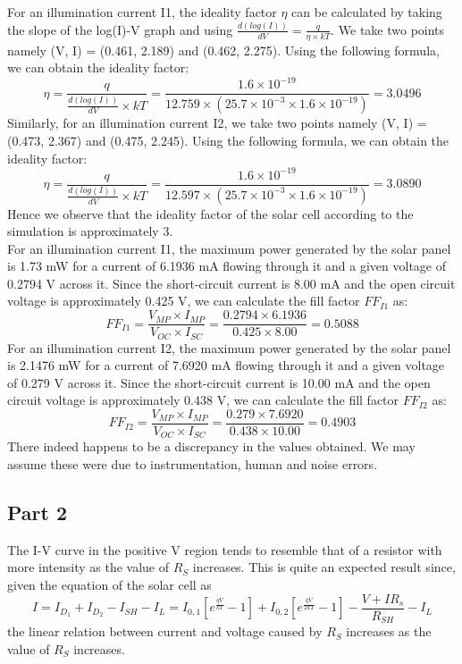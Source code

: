 \documentclass[12pt]{article}
\begin{document}
For an illumination current I1, the ideality factor \( \eta \) can be calculated by taking the slope of the log(I)-V graph and using \( \frac{d(log(I))}{dV} = \frac{q}{\eta \times kT} \). We take two points namely (V, I) = (0.461, 2.189) and (0.462, 2.275). Using the following formula, we can obtain the ideality factor: \[ \eta  = \frac{q}{\frac{d(log(I))}{dV} \times kT} = \frac{1.6 \times 10^{-19}}{12.759 \times \left( 25.7 \times 10^{-3} \times 1.6 \times 10^{-19} \right)} = 3.0496 \]
Similarly, for an illumination current I2, we take two points namely (V, I) = (0.473, 2.367) and (0.475, 2.245). Using the following formula, we can obtain the ideality factor: \[ \eta  = \frac{q}{\frac{d(log(I))}{dV} \times kT} = \frac{1.6 \times 10^{-19}}{12.597 \times \left( 25.7 \times 10^{-3} \times 1.6 \times 10^{-19} \right)} = 3.0890 \]
Hence we observe that the ideality factor of the solar cell according to the simulation is approximately 3.\\
For an illumination current I1, the maximum power generated by the solar panel is 1.73 mW for a current of 6.1936 mA flowing through it and a given voltage of 0.2794 V across it. Since the short-circuit current is 8.00 mA and the open circuit voltage is approximately 0.425 V, we can calculate the fill factor \( FF_{I1} \) as: \[ FF_{I1} = \frac{V_{MP} \times I_{MP}}{V_{OC} \times I_{SC}} = \frac{0.2794 \times 6.1936}{0.425 \times 8.00} = 0.5088\]
For an illumination current I2, the maximum power generated by the solar panel is 2.1476 mW for a current of 7.6920 mA flowing through it and a given voltage of 0.279 V across it. Since the short-circuit current is 10.00 mA and the open circuit voltage is approximately 0.438 V, we can calculate the fill factor \( FF_{I2} \) as: \[ FF_{I2} = \frac{V_{MP} \times I_{MP}}{V_{OC} \times I_{SC}} = \frac{0.279 \times 7.6920}{0.438 \times 10.00} = 0.4903\]
There indeed happens to be a discrepancy in the values obtained. We may assume these were due to instrumentation, human and noise errors.

\subsection{Part 2}

The I-V curve in the positive V region tends to resemble that of a resistor with more intensity as the value of \( R_S \) increases. This is quite an expected result since, given the equation of the solar cell as \[ I = I_{D_1} + I_{D_2} - I_{SH} - I_L = I_{0,1}\left[ e^{\frac{qV}{kT}} - 1 \right] + I_{0,2}\left[ e^{\frac{qV}{2kT}} - 1 \right] - \frac{V+I R_s}{R_{SH}} - I_L\] the linear relation between current and voltage caused by \( R_S \) increases as the value of \( R_S \) increases.
\end{document}
